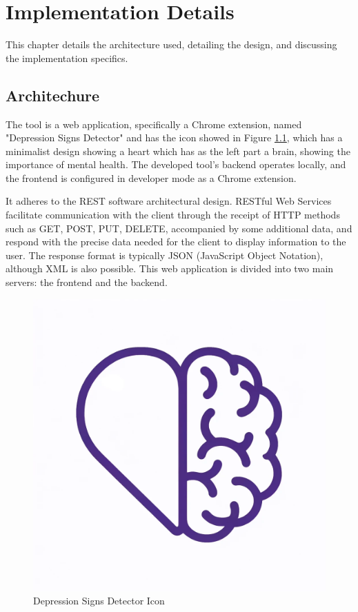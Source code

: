 \chapter{Implementation Details}
\label{chap:ch5}

\quad This chapter details the architecture used, detailing the design, and discussing the implementation specifics.

\section{Architechure}

\quad The tool is a web application, specifically a Chrome extension, named "Depression Signs Detector" and has the icon showed in Figure \ref{depressionsSignsDetectorIcon}, which has a minimalist design showing a heart which has as the left part a brain, showing the importance of mental health. The developed tool's backend operates locally, and the frontend is configured in developer mode as a Chrome extension.

It adheres to the REST software architectural design. RESTful Web Services facilitate communication with the client through the receipt of HTTP methods such as GET, POST, PUT, DELETE, accompanied by some additional data, and respond with the precise data needed for the client to display information to the user. The response format is typically JSON (JavaScript Object Notation), although XML is also possible. This web application is divided into two main servers: the frontend and the backend.

\begin{figure}[htbp]
	\centering
		\includegraphics[scale=0.1]{LaTeX Bachelor Thesis Depression Signs Detection/figures/icon1024.png}
	\caption{Depression Signs Detector Icon}
	\label{depressionsSignsDetectorIcon}
\end{figure}

